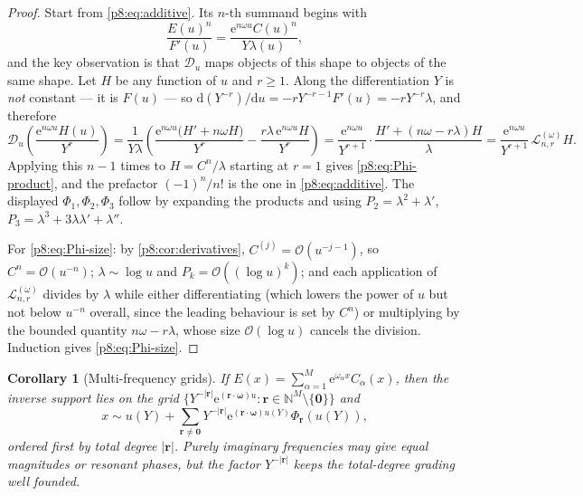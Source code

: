 \documentclass[11pt,a4paper,oneside]{book}
\theoremstyle{plain}
\newtheorem{corollary}[theorem]{Corollary}
\theoremstyle{definition}
\theoremstyle{remark}
\newcommand{\Nat}{\mathbb{N}}
\newcommand{\e}{\mathrm{e}}
\newcommand{\dd}{\mathrm{d}}
\newcommand{\bigO}{\mathcal{O}}
\begin{document}
\begin{proof}
Start from \eqref{p8:eq:additive}.  Its $n$-th summand begins with
\[
 \frac{E(u)^{n}}{F'(u)}
 =\frac{\e^{n\omega u}C(u)^{n}}{Y\lambda(u)},
\]
and the key observation is that $\mathscr{D}_u$ maps objects of this shape to
objects of the same shape.  Let $H$ be any function of $u$ and $r\ge1$.  Along
the differentiation $Y$ is \emph{not} constant --- it is $F(u)$ --- so
$\dd(Y^{-r})/\dd u=-rY^{-r-1}F'(u)=-rY^{-r}\lambda$, and therefore
\begin{equation}\label{p8:eq:operator-step}
 \mathscr{D}_u\!\left(\frac{\e^{n\omega u}H(u)}{Y^{r}}\right)
 =\frac1{Y\lambda}\left(
 \frac{\e^{n\omega u}\bigl(H'+n\omega H\bigr)}{Y^{r}}
 -\frac{r\lambda\,\e^{n\omega u}H}{Y^{r}}\right)
 =\frac{\e^{n\omega u}}{Y^{r+1}}\cdot
 \frac{H'+(n\omega-r\lambda)H}{\lambda}
 =\frac{\e^{n\omega u}}{Y^{r+1}}\,\mathcal{L}^{(\omega)}_{n,r}H .
\end{equation}
Applying this $n-1$ times to $H=C^{n}/\lambda$ starting at $r=1$ gives
\eqref{p8:eq:Phi-product}, and the prefactor $(-1)^{n}/n!$ is the one in
\eqref{p8:eq:additive}.  The displayed $\Phi_1,\Phi_2,\Phi_3$ follow by
expanding the products and using $P_2=\lambda^{2}+\lambda'$,
$P_3=\lambda^{3}+3\lambda\lambda'+\lambda''$.

For \eqref{p8:eq:Phi-size}: by \cref{p8:cor:derivatives},
$C^{(j)}=\bigO(u^{-j-1})$, so $C^{n}=\bigO(u^{-n})$; $\lambda\sim\log u$ and
$P_k=\bigO((\log u)^{k})$; and each application of
$\mathcal{L}^{(\omega)}_{n,r}$ divides by $\lambda$ while either
differentiating (which lowers the power of $u$ but not below $u^{-n}$ overall,
since the leading behaviour is set by $C^{n}$) or multiplying by the bounded
quantity $n\omega-r\lambda$, whose size $\bigO(\log u)$ cancels the division.
Induction gives \eqref{p8:eq:Phi-size}.
\end{proof}

\begin{corollary}[Multi-frequency grids]\label{p8:cor:multi}
If $E(x)=\sum_{\alpha=1}^{M}\e^{\omega_\alpha x}C_\alpha(x)$, then the inverse
support lies on the grid
$\bigl\{Y^{-|\bm r|}\e^{(\bm r\cdot\bm\omega)u}:\bm r\in\Nat^{M}\setminus
\{\bm0\}\bigr\}$ and
\begin{equation}\label{p8:eq:multi}
 x\sim u(Y)+\sum_{\bm r\ne\bm0}
 Y^{-|\bm r|}\e^{(\bm r\cdot\bm\omega)u(Y)}\Phi_{\bm r}(u(Y)),
\end{equation}
ordered first by total degree $|\bm r|$.  Purely imaginary frequencies may give
equal magnitudes or resonant phases, but the factor $Y^{-|\bm r|}$ keeps the
total-degree grading well founded.
\end{corollary}
\end{document}
